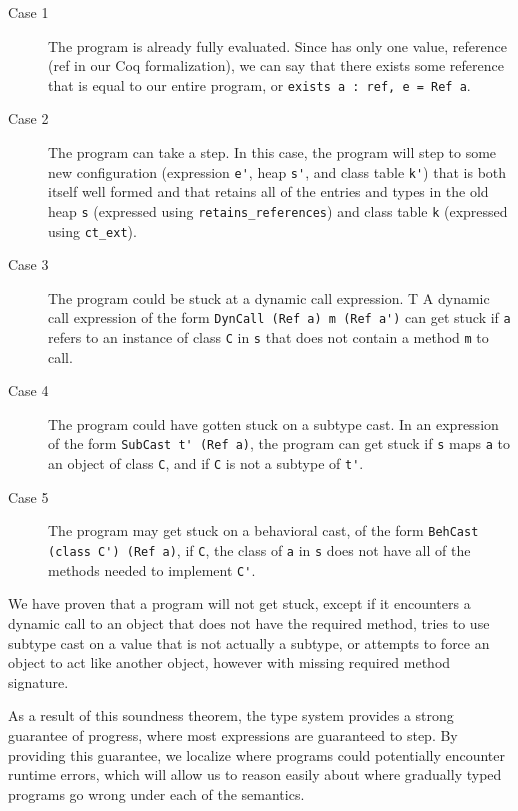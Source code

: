 \documentclass[acmsmall, anonymous, authordraft, review]{acmart} %
\begin{document}
\begin{description}
  \item[Case 1] The program is already fully evaluated. Since \kafka has only one value,
  reference (ref in our Coq formalization), we can say that there exists some
  reference that is equal to our entire program, or \verb|exists a : ref, e = Ref a|.

  \item[Case 2] The program can take a step. In this case, the program will
step to some new configuration (expression \verb|e'|, heap \verb|s'|, and
class table \verb|k'|) that is both itself well formed and that retains all of
the entries and types in the old heap \verb|s| (expressed using
\verb|retains_references|) and class table \verb|k| (expressed using \verb|ct_ext|).

  \item[Case 3] The program could be stuck at a dynamic call expression. T
  A dynamic call expression of the form \verb|DynCall (Ref a) m (Ref a')| can get 
  stuck if \verb|a| refers to an instance of class \verb|C| in \verb|s| 
  that does not contain a method \verb|m| to call. 
  
  \item[Case 4] The program could have gotten stuck on a subtype cast. 
  In an expression of the form \verb|SubCast t' (Ref a)|, the program
  can get stuck if \verb|s| maps \verb|a| to an object of class \verb|C|,
  and if \verb|C| is not a subtype of \verb|t'|.

  \item[Case 5] The program may get stuck on a behavioral cast, of the form
\verb|BehCast (class C') (Ref a)|, if \verb|C|, the class of \verb|a| in
\verb|s| does not have all of the methods needed to implement \verb|C'|.
\end{description}

We have proven that a \kafka program will not get stuck, except if it
encounters a dynamic call to an object that does not have the required method,
tries to use subtype cast on a value that is not actually a subtype, or attempts
to force an object to act like another object, however with missing required 
method signature. 

As a result of this soundness theorem, the \kafka type system provides a
strong guarantee of progress, where most expressions are guaranteed to step.
By providing this guarantee, we localize where \kafka programs could
potentially encounter runtime errors, which will allow us to reason easily
about where gradually typed programs go wrong under each of the semantics.
\end{document}
